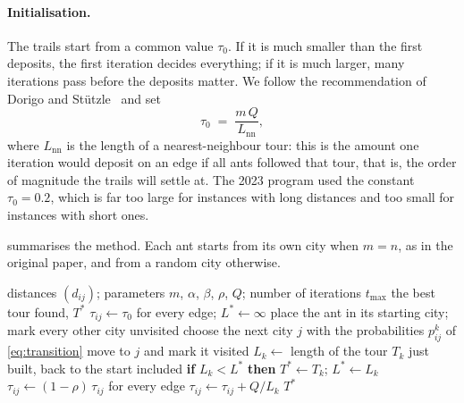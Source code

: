 \documentclass[11pt,a4paper]{article}
\begin{document}
\paragraph{Initialisation.}
The trails start from a common value $\tau_0$. If it is much smaller than the first
deposits, the first iteration decides everything; if it is much larger, many iterations
pass before the deposits matter. We follow the recommendation of Dorigo and
Stützle~\cite{dorigo2004aco} and set
\begin{equation}
    \tau_0 \;=\; \frac{m\,Q}{L_{\mathrm{nn}}},
    \label{eq:tau0}
\end{equation}
where $L_{\mathrm{nn}}$ is the length of a nearest-neighbour tour: this is the amount one
iteration would deposit on an edge if all ants followed that tour, that is, the order of
magnitude the trails will settle at. The 2023 program used the constant $\tau_0=0.2$, which
is far too large for instances with long distances and too small for instances with short
ones.

 summarises the method. Each ant starts from its own city when
$m=n$, as in the original paper, and from a random city otherwise.

\begin{algorithm}[htbp]
    \caption{Ant System for the travelling salesman problem}
    \label{alg:ant-system}
    \begin{algorithmic}[1]
        \Require distances $(d_{ij})$; parameters $m$, $\alpha$, $\beta$, $\rho$, $Q$; number of iterations $t_{\max}$
        \Ensure the best tour found, $T^{\ast}$
        \State $\tau_{ij}\gets\tau_0$ for every edge; \quad $L^{\ast}\gets\infty$
        \State place the ant in its starting city; mark every other city unvisited
        \State choose the next city $j$ with the probabilities $p_{ij}^{k}$ of \cref{eq:transition}
        \State move to $j$ and mark it visited
        \EndWhile
        \State $L_k\gets$ length of the tour $T_k$ just built, back to the start included
        \State \textbf{if} $L_k<L^{\ast}$ \textbf{then} $T^{\ast}\gets T_k$; \; $L^{\ast}\gets L_k$
        \EndFor
        \State $\tau_{ij}\gets(1-\rho)\,\tau_{ij}$ for every edge 
        \State $\tau_{ij}\gets\tau_{ij}+Q/L_k$ 
        \EndFor
        \EndFor
        \State \Return $T^{\ast}$
    \end{algorithmic}
\end{algorithm}
\end{document}
